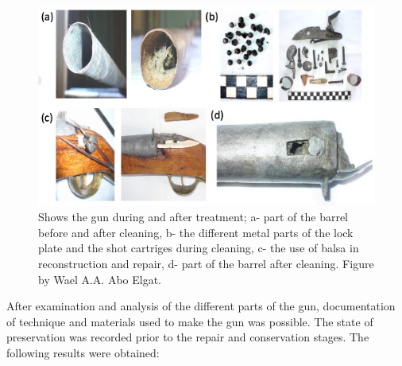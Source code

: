 \begin{figure}[!htb]
	\includegraphics[width=\linewidth]{figures/zidan_Fig3}
	\caption{Shows the gun during and after treatment; a- part of the barrel before and after cleaning, b- the different metal parts of the lock plate and the shot cartriges during cleaning, c- the use of balsa in reconstruction and repair, d- part of the barrel after cleaning. Figure by Wael A.A. Abo Elgat.}
	\label{fig:Fig3}
\end{figure}
After examination and analysis of the different parts of the gun, documentation of technique and materials used to make the gun was possible. The state of preservation was recorded prior to the repair and conservation stages. The following results were obtained: 

